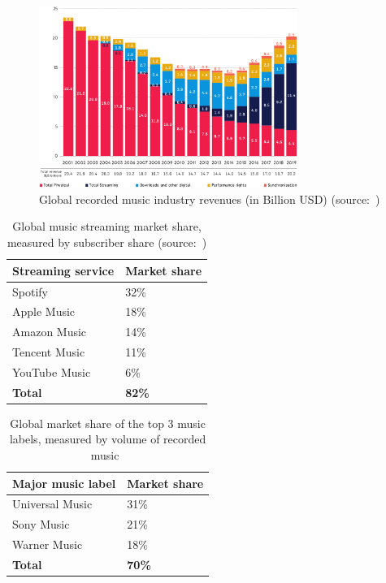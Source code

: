 \begin{figure}
    \centering
    \includegraphics[width=0.75\textwidth]{problem-description/music-industry-revenues-ipfi2020.png}
    \caption{Global recorded music industry revenues (in Billion USD) (source:~\cite{ifpi2020global})}
    \label{fig:music-industry-revenues}
\end{figure}

\begin{table}[]
\centering
\begin{tabular}{|l|l|}
\hline
\textbf{Streaming service} & \textbf{Market share} \\ \hline
Spotify                    & 32\%                  \\ \hline
Apple Music                & 18\%                  \\ \hline
Amazon Music               & 14\%                  \\ \hline
Tencent Music              & 11\%                  \\ \hline
YouTube Music              & 6\%                   \\ \hline
\textbf{Total}             & \textbf{82\%}         \\ \hline
\end{tabular}
\caption{Global music streaming market share, measured by subscriber share (source:~\cite{midiamarketshare2020})}
\label{tab:streaming-service-market-share}
\end{table}

\begin{table}[]
\centering
\begin{tabular}{|l|l|}
\hline
\textbf{Major music label} & \textbf{Market share} \\ \hline
Universal Music                    & 31\%                  \\ \hline
Sony Music                & 21\%                  \\ \hline
Warner Music               & 18\%                  \\ \hline
\textbf{Total}             & \textbf{70\%}         \\ \hline
\end{tabular}
\caption{Global market share of the top 3 music labels, measured by volume of recorded music~\citep{midiamarketshare2020}}
\label{tab:music-labels-market-share}
\end{table}

